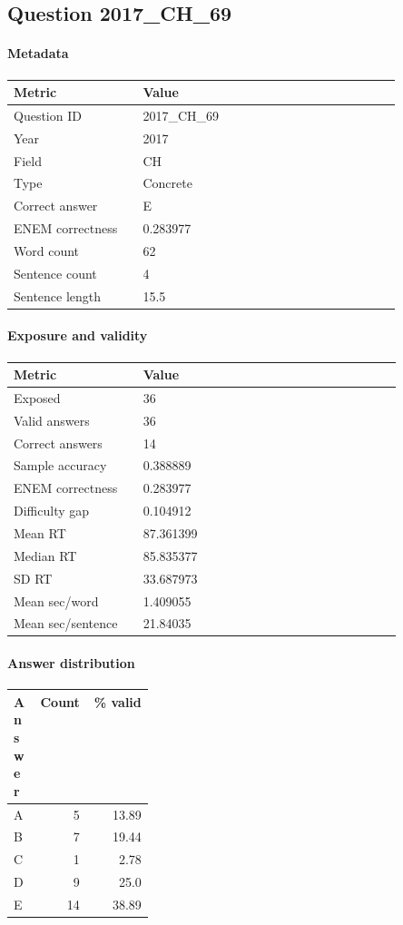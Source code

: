 \subsection*{Question 2017\_CH\_69}
\label{sec:q_2017_CH_69}
\paragraph{Metadata}
\begin{tabular}{p{0.30\linewidth}p{0.60\linewidth}}
\toprule
Metric & Value\\
\midrule
Question ID & 2017\_CH\_69\\
Year & 2017\\
Field & CH\\
Type & Concrete\\
Correct answer & E\\
ENEM correctness & 0.283977\\
Word count & 62\\
Sentence count & 4\\
Sentence length & 15.5\\
\bottomrule
\end{tabular}

\paragraph{Exposure and validity}
\begin{tabular}{p{0.30\linewidth}p{0.60\linewidth}}
\toprule
Metric & Value\\
\midrule
Exposed & 36\\
Valid answers & 36\\
Correct answers & 14\\
Sample accuracy & 0.388889\\
ENEM correctness & 0.283977\\
Difficulty gap & 0.104912\\
Mean RT & 87.361399\\
Median RT & 85.835377\\
SD RT & 33.687973\\
Mean sec/word & 1.409055\\
Mean sec/sentence & 21.84035\\
\bottomrule
\end{tabular}

\paragraph{Answer distribution}
\begin{tabular}{p{0.18\linewidth}rr}
\toprule
Answer & Count & \% valid\\
\midrule
A & 5 & 13.89\\
B & 7 & 19.44\\
C & 1 & 2.78\\
D & 9 & 25.0\\
E & 14 & 38.89\\
\bottomrule
\end{tabular}

